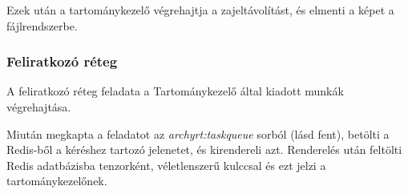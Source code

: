 Ezek után a tartománykezelő végrehajtja a zajeltávolítást, és elmenti a képet a fájlrendszerbe.

\subsubsection{Feliratkozó réteg}
A feliratkozó réteg feladata a Tartománykezelő által kiadott munkák végrehajtása.

Miután megkapta a feladatot az \emph{archyrt:taskqueue} sorból (lásd fent), betölti a Redis-ből a kéréshez tartozó jelenetet, és kirendereli azt. Renderelés után feltölti Redis adatbázisba tenzorként, véletlenszerű kulccsal és ezt jelzi a tartománykezelőnek.